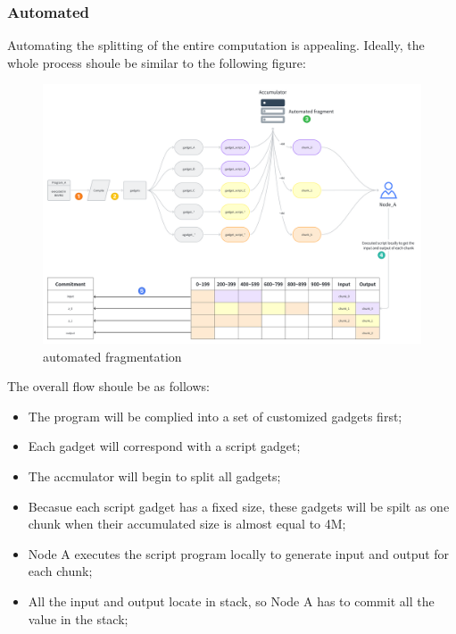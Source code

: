 \subsubsection{Automated}

Automating the splitting of the entire computation is appealing. Ideally, the whole process shoule be similar to the following figure:

\begin{figure}[ht] 
    \centering  
    \includegraphics[width=0.85\columnwidth]{images/automated-fragment.png} 
    \caption{automated fragmentation}
    \label{fig:automated-fragment}
\end{figure}

The overall flow shoule be as follows:
\begin{itemize}
    \item The program will be complied into a set of customized gadgets first;
    \item Each gadget will correspond with a script gadget;
    \item The accmulator will begin to split all gadgets;
    \item Becasue each script gadget has a fixed size, these gadgets will be spilt as one chunk when their accumulated size is almost equal to 4M;
    \item Node A executes the script program locally to generate input and output for each chunk;
    \item All the input and output locate in stack, so Node A has to commit all the value in the stack;
\end{itemize}

